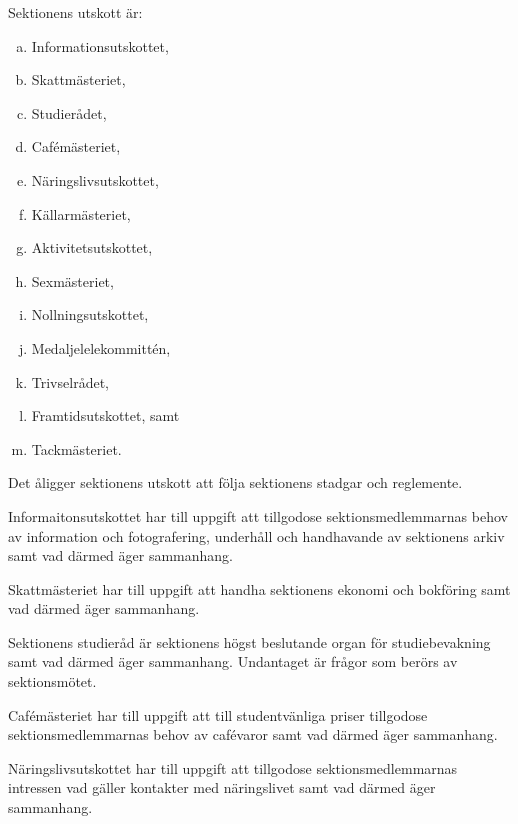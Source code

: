 \documentclass[stadgar]{dsekprotokoll}
\begin{document}
\begin{stadgeavsnitt}


Sektionens utskott är:
\begin{enumerate}[a)]
\item Informationsutskottet,
\item Skattmästeriet,
\item Studierådet,
\item Cafémästeriet,
\item Näringslivsutskottet,
\item Källarmästeriet,
\item Aktivitetsutskottet,
\item Sexmästeriet,
\item Nollningsutskottet,
\item Medaljelelekommittén,
\item Trivselrådet,
\item Framtidsutskottet, samt
\item Tackmästeriet.
\end{enumerate}


Det åligger sektionens utskott att följa sektionens stadgar och
reglemente.


Informaitonsutskottet har till uppgift att tillgodose sektionsmedlemmarnas behov av information och fotografering, underhåll och handhavande av sektionens arkiv samt vad därmed äger sammanhang.


Skattmästeriet har till uppgift att handha sektionens ekonomi och bokföring
samt vad därmed äger sammanhang.


Sektionens studieråd är sektionens högst beslutande organ för studiebevakning samt vad
därmed äger sammanhang. Undantaget är frågor som berörs av sektionsmötet.


Cafémästeriet har till uppgift att till studentvänliga priser tillgodose
sektionsmedlemmarnas behov av cafévaror samt vad därmed äger sammanhang.

Näringslivsutskottet har till uppgift att tillgodose sektionsmedlemmarnas
intressen vad gäller kontakter med näringslivet samt vad därmed äger
sammanhang.


\end{stadgeavsnitt}
\end{document}
